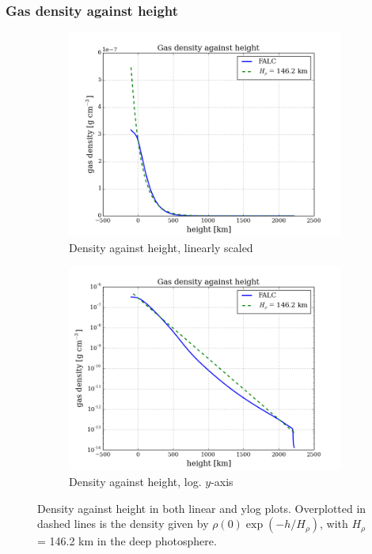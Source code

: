 \documentclass{article}
\begin{document}
\subsubsection{Gas density against height}
\begin{figure}[H]
  \centering
  \begin{subfigure}{0.49\textwidth}
    \includegraphics[scale=0.37]{../figures/falc/falc_h_dens2.png}
    \caption{Density against height, linearly scaled}
  \end{subfigure}
  \begin{subfigure}{0.49\textwidth}
    \includegraphics[scale=0.37]{../figures/falc/falc_h_dens3.png}
    \caption{Density against height, log. $y$-axis}
  \end{subfigure}

  \caption{Density against height in both linear and ylog plots. Overplotted in dashed lines is the density given by $\rho(0)\exp(-h/H_{\rho})$, with $H_{\rho}$ = 146.2 km in the deep photosphere.}
\end{figure}
\end{document}
